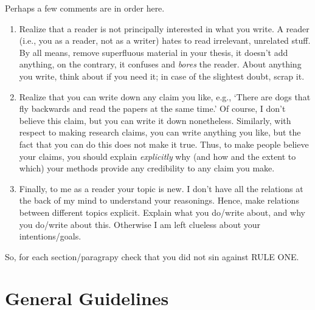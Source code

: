 \documentclass{article}
\begin{document}
Perhaps a few comments are in order here. 
\begin{enumerate}
\item Realize that a reader is not principally interested in what you
  write.  A reader (i.e., you as a reader, not as a writer) hates to
  read irrelevant, unrelated stuff. By all means, remove superfluous
  material in your thesis, it doesn't add anything, on the contrary,
  it confuses and \emph{bores} the reader. About anything you write,
  think about if you need it; in case of the slightest doubt, scrap
  it.
\item Realize that you can write down any claim you like, e.g., `There
  are dogs that fly backwards and read the papers at the same time.'
  Of course, I don't believe this claim, but you can write it down
  nonetheless. Similarly, with respect to making research claims, you
  can write anything you like, but the fact that you can do this
  does not make it true. Thus, to make people believe your claims, you
  should explain \emph{explicitly} why (and how and the extent to
  which) your methods provide any credibility to any claim you make.
\item Finally, to me as a reader your topic is new. I don't have all
  the relations at the back of my mind to understand your
  reasonings. Hence, make relations between different topics
  explicit. Explain what you do/write about, and why you do/write about
  this. Otherwise I am left clueless about your intentions/goals.
\end{enumerate}

So, for each section/paragrapy check that you did not sin against RULE
ONE.


\section{General Guidelines}
\label{sec:most-important-rule}
\end{document}
